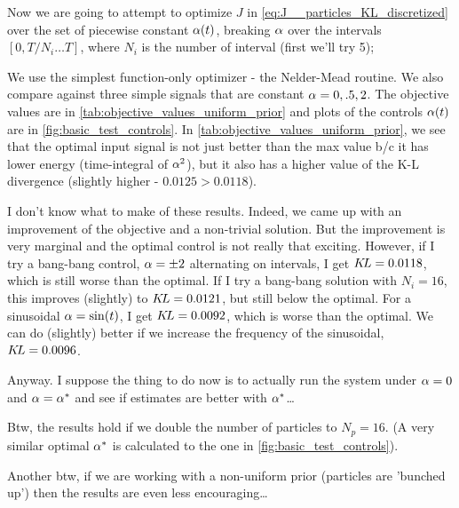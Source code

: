 \documentclass{article}
\begin{document}
Now we are going to attempt to optimize $J$ in
\cref{eq:J__particles_KL_discretized} over the set of piecewise constant
${\alpha}(t)$, breaking ${\alpha}$ over the intervals $[0, T/N_i\ldots T]$, 
where $N_i$ is the number of interval (first we'll try 5);

We use the simplest function-only optimizer - the Nelder-Mead routine. We also
compare against three simple signals that are constant ${\alpha} = 0, .5, 2$. The
objective values are in \cref{tab:objective_values_uniform_prior} and plots of
the controls ${\alpha}(t)$ are in \cref{fig:basic_test_controls}. In
\cref{tab:objective_values_uniform_prior}, we see that the optimal input signal
is not just better than the max value b/c it has lower energy (time-integral of
${\alpha}^2$), but it also has a higher value of the K-L divergence (slightly higher
- $0.0125 > 0.0118 $).

I don't know what to make of these results. Indeed, we came up with an
improvement of the objective and a non-trivial solution. But the improvement is very marginal and
the optimal control is not really that exciting. However, if I try a bang-bang
control, ${\alpha} = \pm 2$ alternating on intervals, I get ${ K\!L} = 0.0118$, which is
still worse than the optimal. If I try a bang-bang solution with $N_i = 16$,
this improves (slightly) to ${ K\!L} =0.0121$, but still below the optimal. For a
sinusoidal ${\alpha} = \sin(t)$, I get ${ K\!L} = 0.0092$, which is worse than the
optimal. We can do (slightly) better if we increase the frequency of the
sinusoidal, ${ K\!L} = 0.0096$.

Anyway. I suppose the thing to do now is to actually run the system under
${\alpha}=0$ and ${\alpha}= {\alpha}^*$ and see if estimates are better with ${\alpha}^*$\ldots

Btw, the results hold if we double the number of particles to $N_p = 16$. (A
very similar optimal ${\alpha}^*$ is calculated to the one in
\cref{fig:basic_test_controls}).

Another btw, if we are working with a non-uniform prior (particles are 'bunched
up') then the results are even less encouraging\ldots
\end{document}
